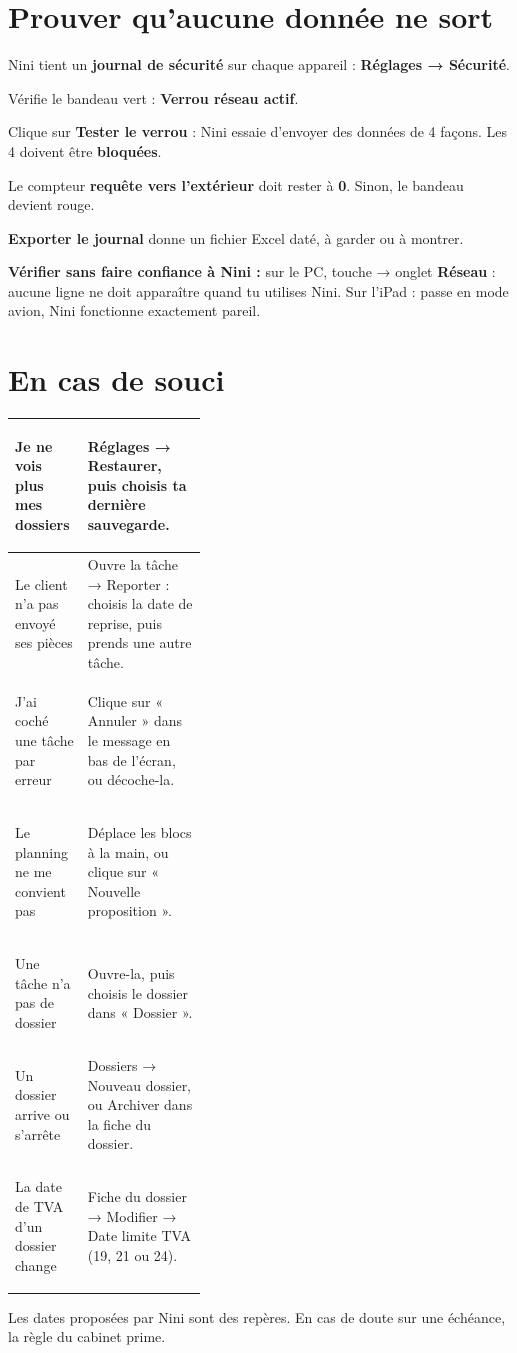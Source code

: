 \documentclass[11pt,a4paper]{article}
\newcommand{\muted}[1]{{\color{ink2}#1}}
\newcommand{\kbd}[1]{\tcbox[on line, boxsep=0pt, left=3pt, right=3pt, top=1.5pt, bottom=1.5pt,
  colback=soft, colframe=line, boxrule=0.5pt, arc=2pt]{\ttfamily\small #1}}
\newcommand{\btn}[1]{\textbf{#1}}
\begin{document}
\section{Prouver qu’aucune donnée ne sort}
Nini tient un \btn{journal de sécurité} sur chaque appareil : \btn{Réglages → Sécurité}.
\begin{etapes}
  \item Vérifie le bandeau vert : \btn{Verrou réseau actif}.
  \item Clique sur \btn{Tester le verrou} : Nini essaie d’envoyer des données de 4 façons. Les 4 doivent être \btn{bloquées}.
  \item Le compteur \btn{requête vers l’extérieur} doit rester à \btn{0}. Sinon, le bandeau devient rouge.
  \item \btn{Exporter le journal} donne un fichier Excel daté, à garder ou à montrer.
\end{etapes}
\begin{note}
\textbf{Vérifier sans faire confiance à Nini :} sur le PC, touche \kbd{F12} → onglet \btn{Réseau} : aucune ligne ne doit apparaître quand tu utilises Nini.
Sur l’iPad : passe en mode avion, Nini fonctionne exactement pareil.
\end{note}

\section{En cas de souci}
{\renewcommand{\arraystretch}{1.55}
\begin{tabularx}{\linewidth}{@{}>{\bfseries\raggedright\arraybackslash}p{0.38\linewidth}>{\raggedright\arraybackslash\leavevmode\color{ink2}}X@{}}
\hline
Je ne vois plus mes dossiers & Réglages → Restaurer, puis choisis ta dernière sauvegarde. \\ \hline
Le client n’a pas envoyé ses pièces & Ouvre la tâche → Reporter : choisis la date de reprise, puis prends une autre tâche. \\ \hline
J’ai coché une tâche par erreur & Clique sur « Annuler » dans le message en bas de l’écran, ou décoche-la. \\ \hline
Le planning ne me convient pas & Déplace les blocs à la main, ou clique sur « Nouvelle proposition ». \\ \hline
Une tâche n’a pas de dossier & Ouvre-la, puis choisis le dossier dans « Dossier ». \\ \hline
Un dossier arrive ou s’arrête & Dossiers → Nouveau dossier, ou Archiver dans la fiche du dossier. \\ \hline
La date de TVA d’un dossier change & Fiche du dossier → Modifier → Date limite TVA (19, 21 ou 24). \\ \hline
\end{tabularx}}

\vfill
{\small\muted{Les dates proposées par Nini sont des repères. En cas de doute sur une échéance, la règle du cabinet prime.}}
\end{document}
